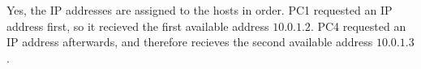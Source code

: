 Yes, the IP addresses are assigned to the hosts in order. PC1 requested an IP address first, so it recieved the first available address $10.0.1.2$. PC4 requested an IP address afterwards, and therefore recieves the second available address $10.0.1.3$.
